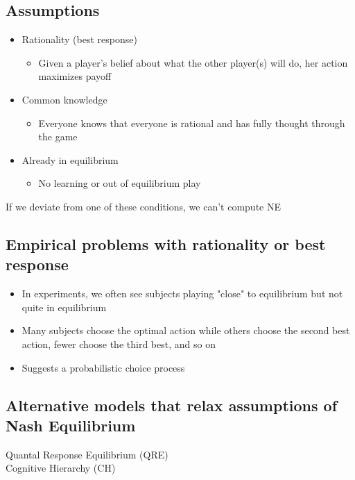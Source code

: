 \subsection{Assumptions}
\begin{itemize}
    \item Rationality (best response)
    \begin{itemize}
        \item Given a player's belief about what the other player(s) will do, her action maximizes payoff
    \end{itemize}
    \item Common knowledge
    \begin{itemize}
        \item Everyone knows that everyone is rational and has fully thought through the game
    \end{itemize}
    \item Already in equilibrium
    \begin{itemize}
        \item No learning or out of equilibrium play
    \end{itemize}
\end{itemize}
If we deviate from one of these conditions, we can't compute NE
\subsection{Empirical problems with rationality or best response}
\begin{itemize}
    \item In experiments, we often see subjects playing "close" to equilibrium but not quite in equilibrium
    \item Many subjects choose the optimal action while others choose the second best action, fewer choose the third best, and so on
    \item Suggests a probabilistic choice process
\end{itemize}
\subsection{Alternative models that relax assumptions of Nash Equilibrium}
Quantal Response Equilibrium (QRE) 
\\Cognitive Hierarchy (CH)
